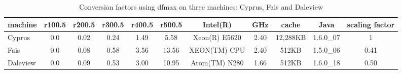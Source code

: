 \documentclass{l4proj}
\begin{document}
\begin{table}
\begin{center}
\begin{scriptsize}
\begin{tabular}{|l|c|c|c|c|c|c|c|c|c|c|} \hline 
machine & r100.5 & r200.5 & r300.5 & r400.5 & r500.5 & Intel(R) & GHz & cache & Java & scaling factor\\ \hline
Cyprus & 0.0 & 0.02 & 0.24 & 1.49 & 5.58 & Xeon(R) E5620 & 2.40 & 12,288KB & 1.6.0\_07 & 1 \\ \hline
Fais & 0.0 & 0.08 & 0.58 & 3.56 & 13.56 & XEON(TM) CPU & 2.40& 512KB & 1.5.0\_06 & 0.41 \\ \hline
Daleview & 0.0 & 0.09 & 0.53 & 3.00 & 10.95 & Atom(TM) N280 & 1.66 & 512KB & 1.6.0\_18 & 0.50 \\ \hline
\end{tabular}
\end{scriptsize}
\end{center}
\caption{Conversion factors using dfmax on three machines: Cyprus, Fais and Daleview}
\label{rosettaStone}
\end{table}
\end{document}
